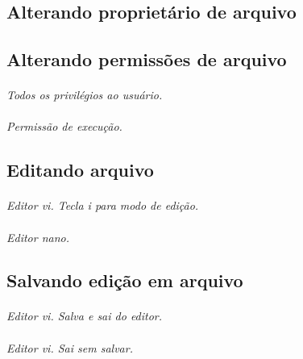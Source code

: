 \documentclass[a4paper,9pt]{extarticle}
\begin{document}
\begin{multicols}{2}
\subsection{Alterando proprietário de arquivo}

	
\subsection{Alterando permissões de arquivo}

	\paragraph{} \emph{Todos os privilégios ao usuário.}
	
	\paragraph{} \emph{Permissão de execução.}

\subsection{Editando arquivo}
	
	\paragraph{} \emph{Editor vi. Tecla i para modo de edição.}
	
	\paragraph{} \emph{Editor nano.}

\subsection{Salvando edição em arquivo} 
	
	\paragraph{} \emph{Editor vi. Salva e sai do editor.}
	
	\paragraph{} \emph{Editor vi. Sai sem salvar.}
	

\end{multicols}
\end{document}
